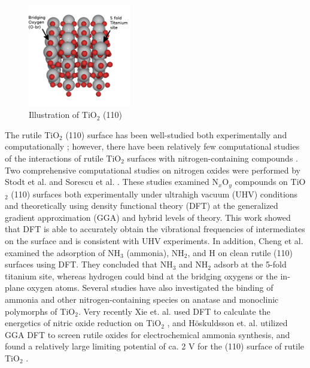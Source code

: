 \documentclass[journal=ascecg,manuscript=article,articletitle=true]{achemso}
\begin{document}
\begin{figure}[h]
\centering
\includegraphics[width=0.4\textwidth]{figures/slab_angle.png}
\caption{Illustration of TiO$_2$ (110)}
\label{fig:model_surface}
\end{figure}
The rutile TiO$_2$ (110) surface has been well-studied both experimentally \cite{Benkoula2015,Walle2009,Lu1994,Rusu2000,Rusu2001,Henderson_2011} and computationally \cite{Stodt2013,Sorescu2000,Cheng2011,Diebold_2003}; however, there have been relatively few computational studies of the interactions of rutile TiO$_2$ surfaces with nitrogen-containing compounds \cite{Stodt2013,Sorescu2000,Cheng2011,H_skuldsson_2017,Xie_2017}. Two comprehensive computational studies on nitrogen oxides were performed by Stodt et al. \cite{Stodt2013} and Sorescu et al. \cite{Sorescu2000}.  These studies examined N$_x$O$_y$ compounds on TiO$_2$ (110) surfaces both experimentally under ultrahigh vacuum (UHV) conditions and theoretically using density functional theory (DFT) at the generalized gradient approximation (GGA)\cite{Sorescu2000} and hybrid \cite{Stodt2013} levels of theory. This work showed that DFT is able to accurately obtain the vibrational frequencies of intermediates on the surface and is consistent with UHV experiments.
In addition, Cheng et al. \cite{Cheng2011} examined the adsorption of NH$_3$ (ammonia), NH$_2$, and H on clean rutile (110) surfaces using DFT. They concluded that NH$_3$ and NH$_2$ adsorb at the 5-fold titanium site, whereas hydrogen could bind at the bridging oxygens or the in-plane oxygen atoms. Several studies have also investigated the binding of ammonia and other nitrogen-containing species on anatase \cite{Onal_2006,Erdogan_2010,Erdogan_2011,Markovits_1996,Ji_2014} and monoclinic \cite{Guo_2012} polymorphs of TiO$_2$. Very recently Xie et. al. used DFT to calculate the energetics of nitric oxide reduction on TiO$_2$ \cite{Xie_2017}, and H\"{o}skuldsson et. al. utilized GGA DFT to screen rutile oxides for electrochemical ammonia synthesis, and found a relatively large limiting potential of ca. 2 V for the (110) surface of rutile TiO$_2$ \cite{H_skuldsson_2017}.
\end{document}
